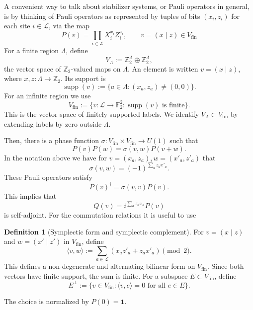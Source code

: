 \documentclass[aps,pra,reprint,superscriptaddress]{revtex4-2}
\newcommand{\cL}{{\mathcal L}}
\renewcommand\L{\Lambda}
\newcommand\s{\sigma}
\newcommand{\id}{\mathbf 1}
\theoremstyle{definition}
\newtheorem{definition}[theorem]{Definition}
\theoremstyle{remark}
\begin{document}
A convenient way \cite{Calderbank:1996aj} to talk about stabilizer systems, or Pauli operators in general, is by thinking of Pauli
operators as represented by tuples of bits $(x_i,z_i)$ for each site $i \in
\cL$, via the map
\begin{equation}
    P(v) = \prod_{i \in \cL} X_i^{x_i} Z_i^{z_i},\qquad v=(x\mid z)\in V_{\mathrm{fin}}
\end{equation}
For a finite region $\Lambda$, define
\begin{equation}
    V_\Lambda:=\mathbb{Z}_2^\Lambda\oplus\mathbb{Z}_2^\Lambda,
\end{equation}
the vector space of $\mathbb{Z}_2$-valued maps on $\Lambda$.
An element is written $v=(x\mid z)$, where $x,z:\Lambda\to\mathbb{Z}_2$.  Its
support is
\begin{equation}
    \operatorname{supp}(v):=\{a\in\Lambda:(x_a,z_a)\ne(0,0)\}.
\end{equation}
For an infinite region we use 
\begin{equation}
    V_{\mathrm{fin}}:=\{v:\cL\to\mathbb{F}_2^2:\operatorname{supp}(v)\text{ is finite}\}.
\end{equation}
This is the vector space of finitely supported labels.
We identify $V_\L \subset V_{\mathrm{fin}}$ by extending labels by zero outside
$\L$.

Then, there is a phase function
$\sigma:V_{\mathrm{fin}}\times V_{\mathrm{fin}}\to U(1)$ such that
\begin{equation}\label{eq:pauli_product}
  P(v)P(w)=\sigma(v,w)P(v+w).
\end{equation}
In the notation above we have for $v = (x_a,z_a), w = (x'_a,z'_a)$ that 
\begin{equation}\label{eq:pauli_phase}
    \s(v,w) = (-1)^{\sum_a z_a x'_a}.
\end{equation}
These Pauli operators satisfy 
\begin{equation}\label{eq:adjoint_pauli}
    P(v)^\dagger = \s(v,v) P(v).
\end{equation}
This implies that 
\begin{equation}\label{eq:self_adjoint_pauli}
    Q(v) = i^{\sum_a z_a x_a} P(v) 
\end{equation}
is self-adjoint.
For the commutation relations it is useful to use
\begin{definition}[Symplectic form and symplectic complement]
For $v=(x\mid z)$ and $w=(x'\mid z')$ in $V_{\mathrm{fin}}$, define
    \begin{equation}\label{def:symplectic_pauli_form}
    \langle v,w\rangle :=  \sum_{a \in \cL}(x_a z'_a+z_a x'_a) \pmod 2.
    \end{equation}
    This defines a non-degenerate and alternating bilinear form on
    $V_{\mathrm{fin}}$. Since both vectors have finite support, the sum is
    finite. For a subspace
$E\subset V_{\mathrm{fin}}$, define
\begin{equation}
    E^\perp:=\{v\in V_{\mathrm{fin}}:\langle v,e\rangle=0\text{ for all }e\in E\}.
\end{equation}
\end{definition}
The choice is normalized by \(P(0)=\id\).    
\end{document}
